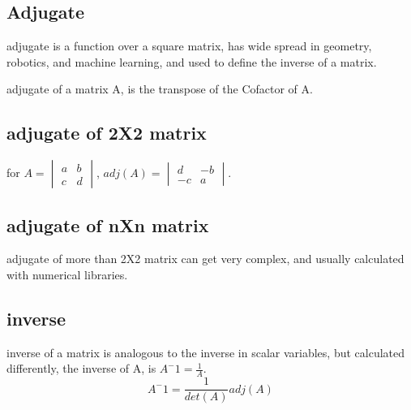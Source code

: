 \documentclass[4apaper,12pt]{book}
\begin{document}
\begin{description}
                \subsection{Adjugate}
                \item adjugate is a function over a square matrix, has wide spread in geometry, robotics, and machine learning, and used to define the inverse of a matrix.
                \item adjugate of a matrix A, is the transpose of the Cofactor of A.
                    \subsection{adjugate of 2X2 matrix}
                \item for $A=\begin{vmatrix}a&b\\c&d\end{vmatrix}$,  $adj(A)=\begin{vmatrix}d&-b\\-c&a\end{vmatrix}$.
                  \subsection{adjugate of nXn matrix}
                \item adjugate of more than 2X2 matrix can get very complex, and usually calculated with numerical libraries.
                  \subsection{inverse}
                \item inverse of a matrix is analogous to the inverse in scalar variables, but calculated differently, the inverse of A, is $A^-1=\frac{1}{A}$.
                  \begin{equation} A^-1 = \frac{1}{det(A)}adj(A) \end{equation}

\end{description}
\end{document}
